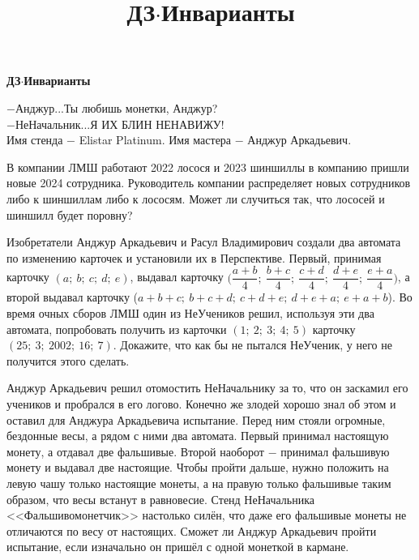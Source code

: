 \centerline{\bf \Huge ДЗ$\cdot$Инварианты}
\title{ДЗ$\cdot$Инварианты}

\begin{flushright}
    \scriptsize
    $-$Анджур...Ты любишь монетки, Анджур?\\
    $-$НеНачальник...Я ИХ БЛИН НЕНАВИЖУ!\\
    Имя стенда $-$ Elistar Platinum. Имя мастера $-$ Анджур Аркадьевич. 
    
\end{flushright}


В компании ЛМШ работают 2022 лосося и 2023 шиншиллы в компанию пришли новые 2024 сотрудника. Руководитель компании распределяет новых сотрудников либо к шиншиллам либо к лососям. Может ли случиться так, что лососей и шиншилл будет поровну?

Изобретатели Анджур Аркадьевич и Расул Владимирович создали два автомата по изменению карточек и установили их в Перспективе. Первый, принимая карточку $(a; \ b; \ c; \ d; \ e)$, выдавал карточку $\biggl( \dfrac{a+b}{4}; \ \dfrac{b+c}{4}; \ \dfrac{c+d}{4}; \ \dfrac{d+e}{4}; \ \dfrac{e+a}{4} \biggl)$, а второй выдавал карточку ($a+b+c; \ b+c+d; \ c+d+e; \ d+e+a; \ e+a+b$). Во время очных сборов ЛМШ один из НеУчеников решил, используя эти два автомата, попробовать получить из карточки $(1; \ 2; \ 3; \ 4; \ 5)$ карточку $(25; \ 3; \ 2002; \ 16; \ 7)$. Докажите, что как бы не пытался НеУченик, у него не получится этого сделать.

Анджур Аркадьевич решил отомостить НеНачальнику за то, что он заскамил его учеников и пробрался в его логово. Конечно же злодей хорошо знал об этом и оставил для Анджура Аркадьевича испытание. Перед ним стояли огромные, бездонные весы, а рядом с ними два автомата. Первый принимал настоящую монету, а отдавал две фальшивые. Второй наоборот $-$ принимал фальшивую монету и выдавал две настоящие. Чтобы пройти дальше, нужно положить на левую чашу только настоящие монеты, а на правую только фальшивые таким образом, что весы встанут в равновесие. Стенд НеНачальника <<Фальшивомонетчик>> настолько силён, что даже его фальшивые монеты не отличаются по весу от настоящих. Сможет ли Анджур Аркадьевич пройти испытание, если изначально он пришёл с одной монеткой в кармане.